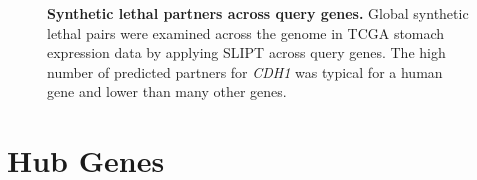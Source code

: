 \begin{figure}[!ht]
\begin{mdframed}
  \begin{center}
   \end{center}
   \caption[Synthetic lethal partners across query genes]{\small \textbf{Synthetic lethal partners across query genes.} Global synthetic lethal pairs were examined across the genome in TCGA stomach expression data by applying SLIPT across query genes. The high number of predicted partners for \textit{CDH1} was typical for a human gene and lower than many other genes.
   }
\label{fig:global_SL_stad}
\end{mdframed}
\end{figure}


\FloatBarrier

\clearpage

\section{Hub Genes}


